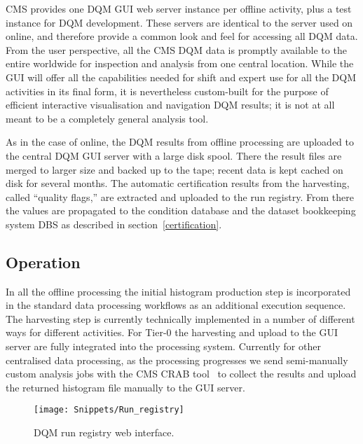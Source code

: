 \documentclass[a4paper]{jpconf}
\begin{document}
CMS provides one DQM GUI web server instance per offline activity, plus a test
instance for DQM development.  These servers are identical to the server used
on online, and therefore provide a common look and feel for accessing all DQM
data.  From the user perspective, all the CMS DQM data is promptly available
to the entire worldwide for inspection and analysis from one central location.
While the GUI will offer all the capabilities needed for shift and expert use
for all the DQM activities in its final form, it is nevertheless custom-built
for the purpose of efficient interactive visualisation and navigation DQM
results; it is not at all meant to be a completely general analysis tool.

As in the case of online, the DQM results from offline processing are uploaded
to the central DQM GUI server with a large disk spool.  There the result files
are merged to larger size and backed up to the tape; recent data is kept
cached on disk for several months.  The automatic certification results from
the harvesting, called ``quality flags,'' are extracted and uploaded to the
run registry.  From there the values are propagated to the condition database
and the dataset bookkeeping system DBS as described in
section~\ref{certification}.

\subsection{Operation}

In all the offline processing the initial histogram production step is
incorporated in the standard data processing workflows as an additional
execution sequence.  The harvesting step is currently technically implemented
in a number of different ways for different activities.  For Tier-0 the
harvesting and upload to the GUI server are fully integrated into the
processing system.  Currently for other centralised data processing, as the
processing progresses we send semi-manually custom analysis jobs with the CMS
CRAB tool~\cite{crab} to collect the results and upload the returned histogram
file manually to the GUI server.


\begin{figure}[!tbp]
\begin{center}
\texttt{[image: Snippets/Run\_registry]}
\caption{\label{fig:runregistry}DQM run registry web interface.}
\end{center}
\end{figure}
\end{document}
